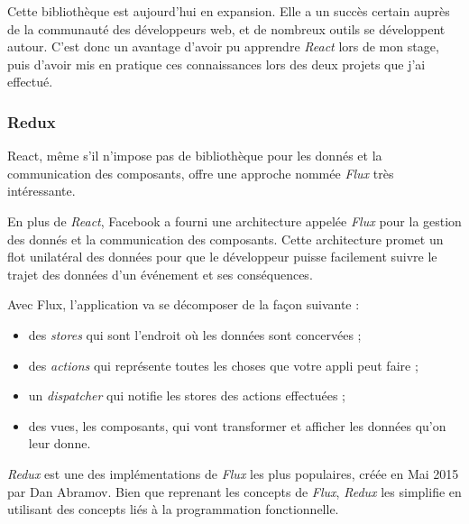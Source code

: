 \documentclass[12pt,a4paper]{article}
\providecommand{\tightlist}{%
  \setlength{\itemsep}{0pt}\setlength{\parskip}{0pt}}
\begin{document}
  \bigskip

  Cette bibliothèque est aujourd'hui en expansion. Elle a un succès
  certain auprès de la communauté des développeurs web, et de nombreux
  outils se développent autour. C'est donc un avantage d'avoir pu
  apprendre \emph{React} lors de mon stage, puis d'avoir mis en pratique
  ces connaissances lors des deux projets que j'ai effectué.

  \bigskip

  \subsubsection{Redux}\label{redux}

  \bigskip

  React, même s'il n'impose pas de bibliothèque pour les donnés et la
  communication des composants, offre une approche nommée \emph{Flux} très
  intéressante.

  \bigskip

  En plus de \emph{React}, Facebook a fourni une architecture appelée
  \emph{Flux} pour la gestion des donnés et la communication des
  composants. Cette architecture promet un flot unilatéral des données
  pour que le développeur puisse facilement suivre le trajet des données
  d'un événement et ses conséquences.

  \bigskip

  Avec Flux, l'application va se décomposer de la façon suivante :

  \begin{itemize}
  \tightlist
  \item
    des \emph{stores} qui sont l'endroit où les données sont concervées ;
  \item
    des \emph{actions} qui représente toutes les choses que votre appli
    peut faire ;
  \item
    un \emph{dispatcher} qui notifie les stores des actions effectuées ;
  \item
    des vues, les composants, qui vont transformer et afficher les données
    qu'on leur donne.
  \end{itemize}

  \bigskip

  \emph{Redux} est une des implémentations de \emph{Flux} les plus
  populaires, créée en Mai 2015 par Dan Abramov. Bien que reprenant les
  concepts de \emph{Flux}, \emph{Redux} les simplifie en utilisant des
  concepts liés à la programmation fonctionnelle.

  \bigskip
\end{document}
